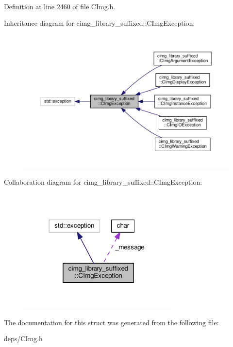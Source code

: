 Definition at line 2460 of file C\+Img.\+h.



Inheritance diagram for cimg\+\_\+library\+\_\+suffixed\+:\+:C\+Img\+Exception\+:
\nopagebreak
\begin{figure}[H]
\begin{center}
\leavevmode
\includegraphics[width=350pt]{d3/d4a/structcimg__library__suffixed_1_1CImgException__inherit__graph}
\end{center}
\end{figure}


Collaboration diagram for cimg\+\_\+library\+\_\+suffixed\+:\+:C\+Img\+Exception\+:
\nopagebreak
\begin{figure}[H]
\begin{center}
\leavevmode
\includegraphics[width=228pt]{d7/de1/structcimg__library__suffixed_1_1CImgException__coll__graph}
\end{center}
\end{figure}


The documentation for this struct was generated from the following file\+:\begin{DoxyCompactItemize}
\item 
deps/C\+Img.\+h\end{DoxyCompactItemize}
